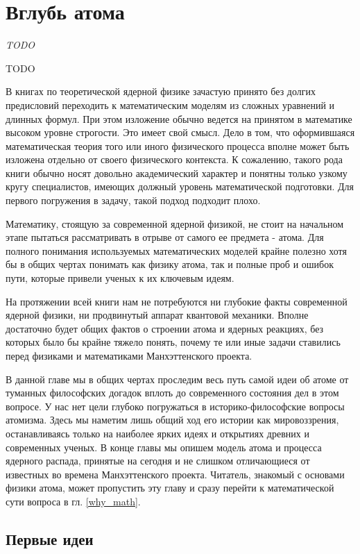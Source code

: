 \chapter{Вглубь атома}

\epigraph{\emph{TODO}}
{TODO}

В книгах по теоретической ядерной физике зачастую принято без долгих предисловий переходить к математическим моделям из сложных уравнений и длинных формул.
При этом изложение обычно ведется на принятом в математике высоком уровне строгости.
Это имеет свой смысл.
Дело в том, что оформившаяся математическая теория того или иного физического процесса вполне может быть изложена отдельно от своего физического контекста.
К сожалению, такого рода книги обычно носят довольно академический характер и понятны только узкому кругу специалистов, имеющих должный уровень математической подготовки. Для первого погружения в задачу, такой подход подходит плохо.

Математику, стоящую за современной ядерной физикой, не стоит на начальном этапе пытаться рассматривать в отрыве от самого ее предмета - атома.
Для полного понимания используемых математических моделей крайне полезно хотя бы в общих чертах понимать как физику атома, так и полные проб и ошибок пути, которые привели ученых к их ключевым идеям.
  
На протяжении всей книги нам не потребуются ни глубокие факты современной ядерной физики, ни продвинутый аппарат квантовой механики.
Вполне достаточно будет общих фактов о строении атома и ядерных реакциях, без которых было бы крайне тяжело понять, почему те или иные задачи ставились перед физиками и математиками Манхэттенского проекта.

В данной главе мы в общих чертах проследим весь путь самой идеи об атоме от туманных философских догадок вплоть до современного состояния дел в этом вопросе. 
У нас нет цели глубоко погружаться в историко-философские вопросы атомизма.
Здесь мы наметим лишь общий ход его истории как мировоззрения, останавливаясь только на наиболее ярких идеях и открытиях древних и современных ученых.
В конце главы мы опишем модель атома и процесса ядерного распада, принятые на сегодня и не слишком отличающиеся от известных во времена Манхэттенского проекта.
Читатель, знакомый с основами физики атома, может пропустить эту главу и сразу перейти к математической сути вопроса в гл. \ref{why_math}.

\section*{Первые идеи}

